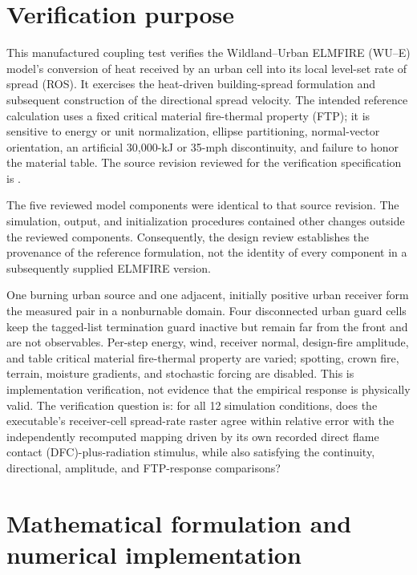 \section{Verification purpose}

This manufactured coupling test verifies the
Wildland--Urban ELMFIRE (WU--E) model's conversion of heat received by an urban cell into its local
level-set rate of spread (ROS). It exercises the heat-driven building-spread
formulation and subsequent construction of the directional spread velocity.
The intended reference calculation uses a fixed critical material fire-thermal
property (FTP); it is sensitive to energy or unit normalization,
ellipse partitioning, normal-vector orientation, an artificial 30,000-kJ or
35-mph discontinuity, and failure to honor the material table. The source
revision reviewed for the verification specification is
\SourceCommit.

The five reviewed model components were identical to that source revision.
The simulation, output, and initialization procedures contained other changes
outside the reviewed components. Consequently, the design review establishes
the provenance of the reference formulation, not the identity of every
component in a subsequently supplied ELMFIRE version.

One burning urban source and one adjacent, initially positive urban receiver
form the measured pair in a nonburnable domain.  Four disconnected urban guard
cells keep the tagged-list termination guard inactive but remain far from the
front and are not observables.  Per-step energy, wind, receiver normal,
design-fire amplitude, and table critical material fire-thermal property are varied; spotting,
crown fire, terrain, moisture gradients, and stochastic forcing are disabled.
This is implementation verification, not evidence that the empirical response
is physically valid.  The verification question is: for all 12 simulation conditions, does
the executable's receiver-cell spread-rate raster agree within
\ROSTolerance{} relative error with the independently recomputed mapping driven
by its own recorded direct flame contact (DFC)-plus-radiation stimulus, while also satisfying the
continuity, directional, amplitude, and FTP-response comparisons?

\ReportOverview

\section{Mathematical formulation and numerical implementation}


